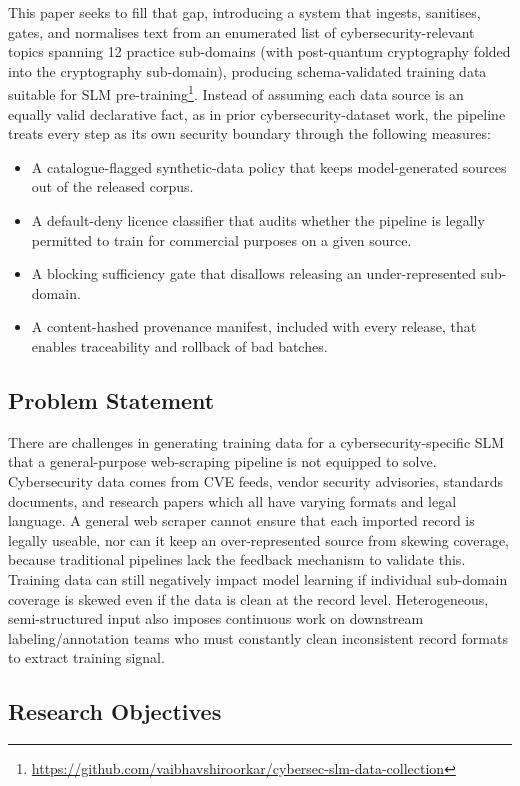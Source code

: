 \documentclass[conference]{IEEEtran}
\begin{document}
This paper seeks to fill that gap, introducing a system that ingests, sanitises, gates, and normalises text from an enumerated list of cybersecurity-relevant topics spanning 12 practice sub-domains (with post-quantum cryptography folded into the cryptography sub-domain), producing schema-validated training data suitable for SLM pre-training\footnote{\url{https://github.com/vaibhavshiroorkar/cybersec-slm-data-collection}}. Instead of assuming each data source is an equally valid declarative fact, as in prior cybersecurity-dataset work, the pipeline treats every step as its own security boundary through the following measures:
\begin{itemize}
\item A catalogue-flagged synthetic-data policy that keeps model-generated sources out of the released corpus.
\item A default-deny licence classifier that audits whether the pipeline is legally permitted to train for commercial purposes on a given source.
\item A blocking sufficiency gate that disallows releasing an under-represented sub-domain.
\item A content-hashed provenance manifest, included with every release, that enables traceability and rollback of bad batches.
\end{itemize}
\subsection{Problem Statement}

There are challenges in generating training data for a cybersecurity-specific
SLM that a general-purpose web-scraping pipeline is not equipped to solve. Cybersecurity data comes from CVE feeds, vendor security advisories, standards documents, and research papers which all have varying formats and legal language. A general web scraper cannot ensure that each imported record is legally useable, nor can it keep an over-represented source from skewing coverage, because traditional pipelines lack the feedback mechanism to validate this. Training data can still negatively impact model learning if individual sub-domain coverage is skewed even if the data is clean at the record level. Heterogeneous, semi-structured input also imposes continuous work on downstream labeling/annotation teams who must constantly clean inconsistent record formats to extract training signal.

\subsection{Research Objectives}
\end{document}
